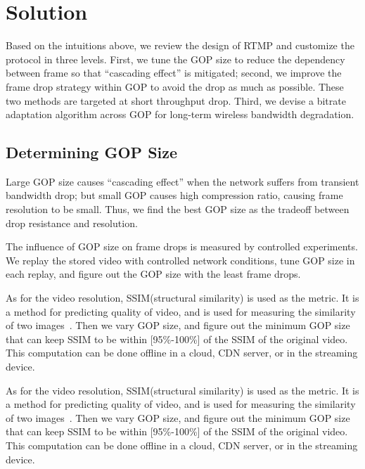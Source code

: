\newcommand{\Mod}[1]{\text{ (mod } #1\text{)}}
\vspace{-0.18in}
\section{\name Solution}
\vspace{-0.05in}
Based on the intuitions above, we review the design of RTMP and customize the protocol in three levels. First, we tune the GOP size to reduce the dependency between frame so that ``cascading effect'' is mitigated; second, we improve the frame drop strategy within GOP to avoid the drop as much as possible. These two methods are targeted at short throughput drop. Third, we devise a bitrate adaptation algorithm across GOP for long-term wireless bandwidth degradation.

\subsection{Determining GOP Size}
Large GOP size causes ``cascading effect'' when the network suffers from transient bandwidth drop; but small GOP causes high compression ratio, causing frame resolution to be small. Thus, we find the best GOP size as the tradeoff between drop resistance and resolution.

The influence of GOP size on frame drops is measured by controlled experiments. We replay the stored video with controlled network conditions, tune GOP size in each replay, and figure out the GOP size with the least frame drops.

As for the video resolution, SSIM(structural similarity) is used as the metric. It is a method for predicting quality of video, and is used for measuring
the similarity of two images~\cite{wang2004image}. Then we vary GOP size, and figure out the minimum GOP size that can keep SSIM to be within [95\%-100\%] of the SSIM of the original video. This computation can be done offline in a cloud, CDN server, or in the streaming device.

As for the video resolution, SSIM(structural similarity) is used as the metric. It is a method for predicting quality of video, and is used for measuring
the similarity of two images~\cite{wang2004image}. Then we vary GOP size, and figure out the minimum GOP size that can keep SSIM to be within [95\%-100\%] of the SSIM of the original video. This computation can be done offline in a cloud, CDN server, or in the streaming device.

